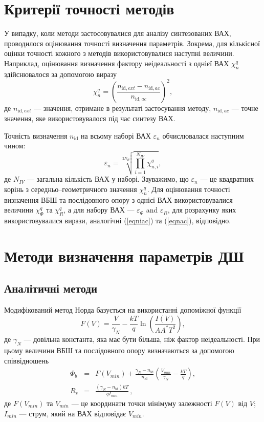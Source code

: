 \section{Критерії точності методів}
У випадку, коли методи застосовувалися для аналізу синтезованих ВАХ, проводилося оцінювання точності визначення параметрів.
Зокрема, для кількісної оцінки точності кожного з методів використовувалися наступні величини.
Наприклад, оцінювання визначення фактору неідеальності з однієї ВАХ $\chi^q_n$ здійснювалося за допомогою виразу
\begin{equation}
\label{eqniac}
\chi^q_n=\left(\frac{n_{\mathrm{id},ext}-n_{\mathrm{id},ac}}{n_{\mathrm{id},ac}}\right)^2,
\end{equation}
де
$n_{\mathrm{id},ext}$ --- значення, отримане в результаті застосування методу,
$n_{\mathrm{id},ac}$ --- точне значення, яке використовувалося під час синтезу ВАХ.


Точність визначення $n_\mathrm{id}$ на всьому наборі ВАХ $\varepsilon_n$ обчислювалася  наступним чином:
\begin{equation}
\label{eqnac}
\varepsilon_n=\sqrt[2N_{I\!V}]{\prod_{i=1}^{N_{I\!V}}\chi^q_{n,i}},
\end{equation}
де
$N_{I\!V}$ --- загальна кількість ВАХ у наборі.
Зауважимо, що $\varepsilon_n$ --- це квадратних корінь з середньо--геометричного значення $\chi^q_n$.
Для оцінювання точності визначення ВБШ та послідовного опору з однієї ВАХ використовувалися величини  $\chi^q_\Phi$ та $\chi^q_R$, а для набору ВАХ --- $\varepsilon_\Phi$ and $\varepsilon_R$, для розрахунку яких використовувалися вирази, аналогічні (\ref{eqniac}) та (\ref{eqnac}), відповідно.

\section{Методи визначення параметрів ДШ}
\subsection{Аналітичні методи\label{AnMethod}}
Модифікований метод Норда \cite{Norde,Lien,Sato,Dermircioglu:Norde} базується на використанні допоміжної функції
\begin{equation}
\label{eqNorde}
F(V)=\frac{V}{\gamma_N}-\frac{kT}{q}\ln\left(\frac{I(V)}{AA^*T^2}\right),
\end{equation}
де
$\gamma_N$ --- довільна константа, яка має бути більша, ніж фактор неідеальності.
При цьому величини ВБШ та послідовного опору визначаються за допомогою співвідношень
\begin{eqnarray}
\label{eqNordDet}
\Phi_b&=&F(V_{min})+\frac{\gamma_N-n_\mathrm{id}}{n_\mathrm{id}}\left(\frac{V_{min}}{\gamma_N}-\frac{kT}{q}\right),
\\
R_s&=&\frac{(\gamma_N-n_\mathrm{id})kT}{qI_{min}}\,,
\end{eqnarray}
де
$F(V_{min})$ та $V_{min}$ --- це координати точки мінімуму залежності $F(V)$ від $V$;
$I_{min}$  --- струм, який на ВАХ відповідає $V_{min}$.

